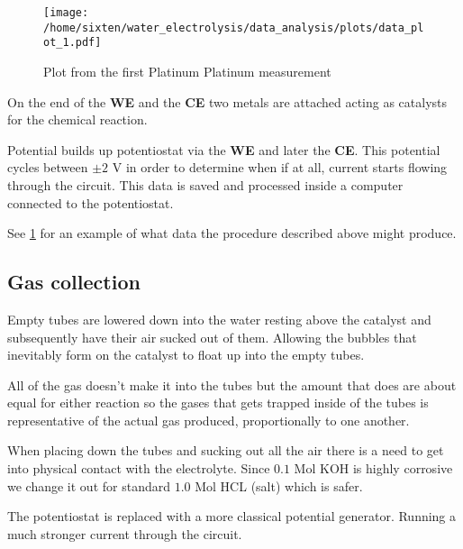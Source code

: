 \documentclass[twocolumn]{revtex4-2}
\begin{document}
\begin{figure}[t]
	\texttt{[image: /home/sixten/water\_electrolysis/data\_analysis/plots/data\_plot\_1.pdf]}
	
	\caption{Plot from the first Platinum Platinum measurement \label{fig:I_Plt_1}}
\end{figure}



On the end of the \textbf{WE} and the \textbf{CE} two metals are attached acting 
as catalysts for the chemical reaction. 

\par
Potential builds up potentiostat via the \textbf{WE} and later the \textbf{CE}. This potential cycles
between $\pm 2$ V in order to determine when if at all, current starts flowing through the circuit.
This data is saved and processed inside a computer connected to the potentiostat.

See \ref{fig:I_Plt_1} for an example of what data the procedure described above might produce.

\subsection{Gas collection}
Empty tubes are lowered down into the water resting above the catalyst and subsequently
have their air sucked out of them. Allowing the bubbles that inevitably form on the
catalyst to float up into the empty tubes. 

\par 
All of the gas doesn't make it into the tubes but the amount that does are about equal
for either reaction so the gases that gets trapped inside of the tubes is representative
of the actual gas produced, proportionally to one another.

\par 
When placing down the tubes and sucking out all the air there is a need to get into 
physical contact with the electrolyte. Since $0.1$ Mol KOH is highly corrosive we change 
it out for standard $1.0$ Mol HCL (salt) which is safer.
\par 
The potentiostat is replaced with a more classical potential generator. Running a much
stronger current through the circuit.
\par
\end{document}
